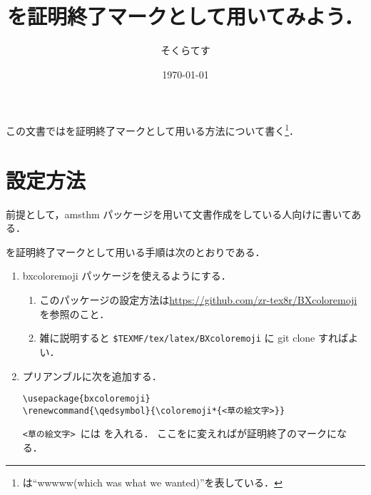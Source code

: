 \documentclass[lualatex, paper=a4, number_of_lines=45]{jlreq}
\title{\qedsymbol を証明終了マークとして用いてみよう．}
\author{そくらてす}
\date{\today}
\begin{document}
\maketitle

この文書では\qedsymbol を証明終了マークとして用いる方法について書く\footnote{\qedsymbol は``wwwww(which was what we wanted)''を表している．}．

\section{設定方法}
前提として，amsthm パッケージを用いて文書作成をしている人向けに書いてある．

\qedsymbol を証明終了マークとして用いる手順は次のとおりである．
\begin{enumerate}
 \item bxcoloremoji パッケージを使えるようにする．
       \begin{enumerate}
	\item このパッケージの設定方法は\url{https://github.com/zr-tex8r/BXcoloremoji}を参照のこと．
	\item 雑に説明すると \verb|$TEXMF/tex/latex/BXcoloremoji| に git clone すればよい．
       \end{enumerate}
 \item プリアンブルに次を追加する．
\begin{verbatim}
\usepackage{bxcoloremoji} 
\renewcommand{\qedsymbol}{\coloremoji*{<草の絵文字>}}
\end{verbatim}
\verb|<草の絵文字> |には を入れる．
ここをに変えればが証明終了のマークになる．
\end{enumerate}
\end{document}
